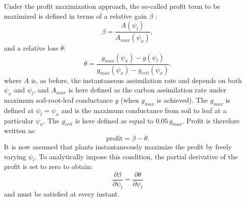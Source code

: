 \documentclass[utf8]{frontiersSCNS} %
\begin{document}
Under the profit maximization approach, the so-called profit term to be maximized is defined in terms of a relative gain $\beta$ \citep{sperry_predicting_2017}:
\begin{equation}
    \beta = \frac{A(\psi_l)}{A_{max}(\psi_x)},
    \label{eqn:rel_gain}
\end{equation}
and a relative loss $\theta$:
\begin{equation}
    \theta = \frac{g_{max}(\psi_x) - g(\psi_l)}{g_{max}(\psi_x) - g_{crit}(\psi_x)}.
    \label{eqn:rel_loss}
\end{equation}
where $A$ is, as before, the instantaneous assimilation rate and depends on both $\psi_x$ and $\psi_l$, and $A_{max}$ is here defined as the carbon assimilation rate under maximum soil-root-leaf conductance $g$ (when $g_{max}$ is achieved). The $g_{max}$ is defined at $\psi_l = \psi_x$ and is the maximum conductance from soil to leaf at a particular $\psi_x$. The $g_{crit}$ is here defined as equal to $0.05\, g_{max}$. Profit is therefore written as:
\begin{equation}
    \text{profit} = \beta - \theta.
    \label{eqn:profit}
\end{equation}
It is now assumed that plants instantaneously maximize the profit by freely varying $\psi_l$. To analytically impose this condition, the partial derivative of the profit is set to zero to obtain:
\begin{equation}
    \frac{\partial \beta}{\partial \psi_l} = \frac{\partial \theta}{\partial \psi_l}
\end{equation}
and must be satisfied at every instant.
\end{document}
